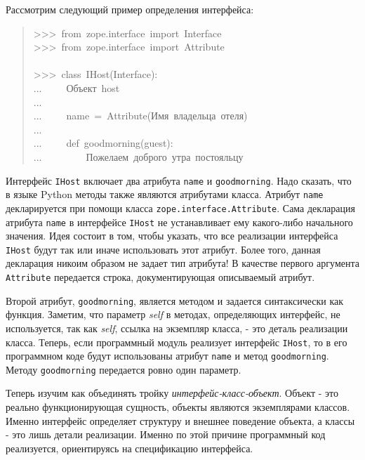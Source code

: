 \documentclass[a4paper,openany,twoside,final]{book}
\providecommand*{\DUroletitlereference}[1]{\textsl{#1}}
\begin{document}
Рассмотрим следующий пример определения интерфейса:

\begin{quote}{\ttfamily \raggedright \noindent
>{}>{}>~from~zope.interface~import~Interface\\
>{}>{}>~from~zope.interface~import~Attribute\\
~\\
>{}>{}>~class~IHost(Interface):\\
...~~~~~\textquotedbl{}\textquotedbl{}\textquotedbl{}Объект~host\textquotedbl{}\textquotedbl{}\textquotedbl{}\\
...\\
...~~~~~name~=~Attribute(\textquotedbl{}\textquotedbl{}\textquotedbl{}Имя~владельца~отеля\textquotedbl{}\textquotedbl{}\textquotedbl{})\\
...\\
...~~~~~def~goodmorning(guest):\\
...~~~~~~~~~\textquotedbl{}\textquotedbl{}\textquotedbl{}Пожелаем~доброго~утра~постояльцу\textquotedbl{}\textquotedbl{}\textquotedbl{}
}
\end{quote}

Интерфейс \texttt{IHost} включает два атрибута \texttt{name} и \texttt{goodmorning}.
Надо сказать, что в языке Python методы также являются атрибутами
класса.  Атрибут \texttt{name} декларируется при помощи класса
\texttt{zope.interface.Attribute}.  Сама декларация атрибута \texttt{name} в
интерфейсе \texttt{IHost} не устанавливает ему какого-либо начального
значения.  Идея состоит в том, чтобы указать, что все реализации
интерфейса \texttt{IHost} будут так или иначе использовать этот атрибут.
Более того, данная декларация никоим образом не задает тип атрибута!
В качестве первого аргумента \texttt{Attribute} передается строка,
документирующая описываемый атрибут.

Второй атрибут, \texttt{goodmorning}, является методом и задается
синтаксически как функция.  Заметим, что параметр \DUroletitlereference{self} в методах,
определяющих интерфейс, не используется, так как \DUroletitlereference{self}, ссылка на
экземпляр класса, - это деталь реализации класса.  Теперь, если
программный модуль реализует интерфейс \texttt{IHost}, то в его программном
коде будут использованы атрибут \texttt{name} и метод \texttt{goodmorning}.
Методу \texttt{goodmorning} передается ровно один параметр.

Теперь изучим как объединять тройку \DUroletitlereference{интерфейс-класс-объект}.  Объект
- это реально функционирующая сущность, объекты являются экземплярами
классов.  Именно интерфейс определяет структуру и внешнее поведение
объекта, а классы - это лишь детали реализации.  Именно по этой
причине программный код реализуется, ориентируясь на спецификацию
интерфейса.
\end{document}
